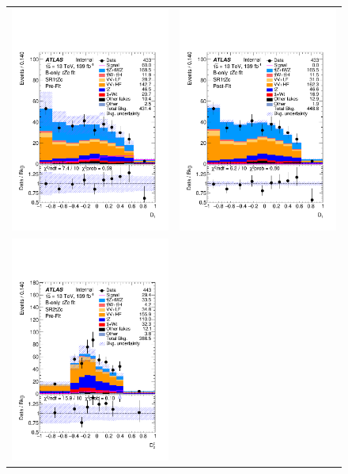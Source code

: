 \clearpage
\begin{figure}[htbp]
	\centering
	\begin{tabular}{cc}
		\includegraphics[width=.45\textwidth]{Appendices/AP9/figures/BONLY_CRSR_DL1rc_unblind/Plots/SR1} &
		\includegraphics[width=.45\textwidth]{Appendices/AP9/figures/BONLY_CRSR_DL1rc_unblind/Plots/SR1_postFit} \\
		\includegraphics[width=.45\textwidth]{Appendices/AP9/figures/BONLY_CRSR_DL1rc_unblind/Plots/SR2} &

\end{tabular}
\end{figure}
